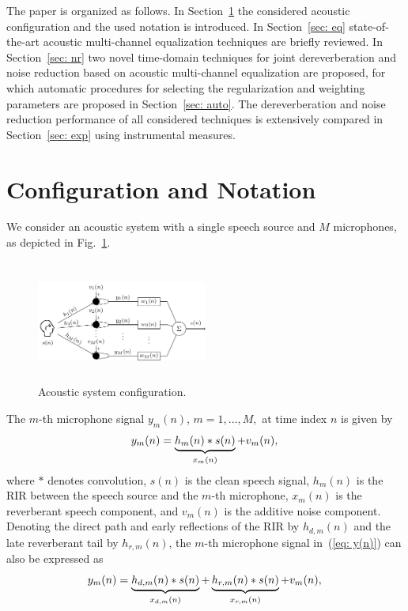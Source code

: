 \documentclass[draftcls,onecolumn,11pt]{IEEEtran}
\begin{document}
The paper is organized as follows. 
In Section~\ref{sec: conf} the considered acoustic configuration and the used notation is introduced.
In Section~\ref{sec: eq} state-of-the-art acoustic multi-channel equalization techniques are briefly reviewed. 
In Section~\ref{sec: nr} two novel time-domain techniques for joint dereverberation and noise reduction based on acoustic multi-channel equalization are proposed, for which automatic procedures for selecting the regularization and weighting parameters are proposed in Section~\ref{sec: auto}.
The dereverberation and noise reduction performance of all considered techniques is extensively compared in Section~\ref{sec: exp} using instrumental measures.

\section{Configuration and Notation}
\label{sec: conf}
We consider an acoustic system with a single speech source and $M$ microphones, as depicted in Fig.~\ref{fig: conf}.
\begin{figure}[b!]
  \centering
  \includegraphics[width = 0.5\textwidth,height = 4cm]{Plots2/configuration.pdf}
  \caption{Acoustic system configuration.}
  \label{fig: conf}
\end{figure}
The $m$-th microphone signal $y_m(n)$, $m = 1, \ldots, M,$ at time index $n$ is given by
\begin{equation}
\label{eq: y(n)}
y_m(n) = \underbrace{h_m(n) \ast s(n)}_{x_m(n)} + v_m(n), \\
\end{equation}
where $\ast$ denotes convolution, $s(n)$ is the clean speech signal, $h_m(n)$ is the RIR between the speech source and the $m$-th microphone, $x_{m}(n)$ is the reverberant speech component, and $v_{m}(n)$ is the additive noise component. 
Denoting the direct path and early reflections of the RIR by $h_{d,m}(n)$ and the late reverberant tail by $h_{r,m}(n)$, the $m$-th microphone signal in~(\ref{eq: y(n)}) can also be expressed as
\begin{equation}
\label{eq: ysp}
y_m(n) = \underbrace{h_{d,m}(n) \ast s(n)}_{x_{d,m}(n)} + \underbrace{h_{r,m}(n) \ast s(n)}_{x_{r,m}(n)} + v_m(n), \\
\end{equation}
\end{document}
